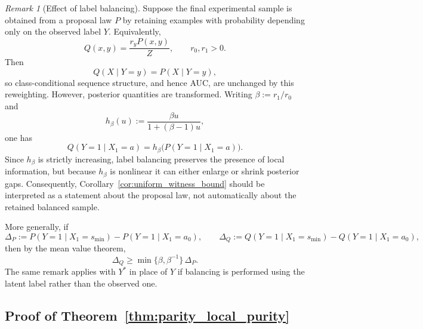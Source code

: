 \documentclass{article}
\theoremstyle{plain}
\theoremstyle{definition}
\theoremstyle{remark}
\newtheorem{remark}[theorem]{Remark}
\begin{document}
\begin{remark}[Effect of label balancing]
\label{rem:label_balancing}
Suppose the final experimental sample is obtained from a proposal law $P$ by
retaining examples with probability depending only on the observed label $Y$.
Equivalently,
\[
Q(x,y)=\frac{r_y P(x,y)}{Z},
\qquad r_0,r_1>0.
\]
Then
\[
Q(X\mid Y=y)=P(X\mid Y=y),
\]
so class-conditional sequence structure, and hence AUC, are unchanged by this
reweighting. However, posterior quantities are transformed. Writing
$\beta:=r_1/r_0$ and
\[
h_\beta(u):=\frac{\beta u}{1+(\beta-1)u},
\]
one has
\[
Q(Y=1\mid X_1=a)
=
h_\beta\!\bigl(P(Y=1\mid X_1=a)\bigr).
\]
Since $h_\beta$ is strictly increasing, label balancing preserves the presence of
local information, but because $h_\beta$ is nonlinear it can either enlarge or
shrink posterior gaps. Consequently,
Corollary~\ref{cor:uniform_witness_bound} should be interpreted as a statement
about the proposal law, not automatically about the retained balanced sample.

More generally, if
\[
\Delta_P
:=
P(Y=1\mid X_1=s_{\min})-P(Y=1\mid X_1=a_0),
\qquad
\Delta_Q
:=
Q(Y=1\mid X_1=s_{\min})-Q(Y=1\mid X_1=a_0),
\]
then by the mean value theorem,
\[
\Delta_Q
\ge
\min\{\beta,\beta^{-1}\}\,\Delta_P.
\]
The same remark applies with $Y^*$ in place of $Y$ if balancing is performed
using the latent label rather than the observed one.
\end{remark}



\subsection{Proof of Theorem~\ref{thm:parity_local_purity}}
\label{appendix:proof_parity_local_purity}
\end{document}
